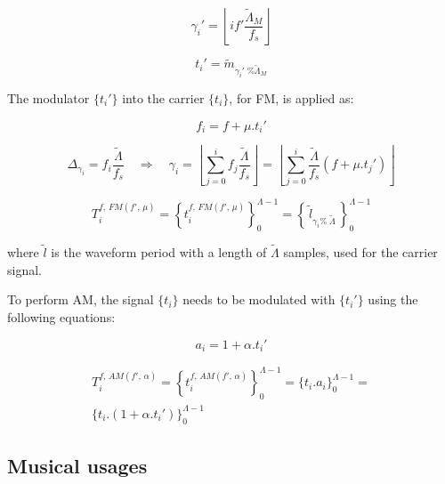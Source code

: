 \begin{equation}\label{fmGammaAux}
\gamma_i'=\left \lfloor i f' \frac{\widetilde{\Lambda}_M}{f_s} \right \rfloor
\end{equation}

\begin{equation}\label{fmAux}
t_i'=\widetilde{m}_{\gamma_i' \;\% \widetilde{\Lambda}_M}
\end{equation}

The modulator $\{t_i'\}$ into the carrier $\{t_i\}$, for FM, is applied as:

\begin{equation}\label{fmF}
f_i=f + \mu . t_i'
\end{equation}

\begin{equation}\label{fmGamma}
\Delta_{\gamma_i}=f_i\frac{\widetilde{\Lambda}}{f_s} \quad \Rightarrow \quad \gamma_i = \left \lfloor \sum_{j=0}^{i} f_j \frac{\widetilde{\Lambda}}{f_s} \right \rfloor = \left \lfloor \sum_{j=0}^{i} \frac{\widetilde{\Lambda}}{f_s}(f+\mu . t_j') \right\rfloor
\end{equation}

\begin{equation}\label{fmT}
T_i^{f,\, FM(f',\,\mu)}=\left\{ t_i^{f,\,FM(f',\,\mu)} \right\}_0^{\Lambda-1}=\left\{\,\widetilde{l}_{\gamma_i \%\; \widetilde{\Lambda} } \,\right\}_0^{\Lambda-1}
\end{equation}


\noindent where $\widetilde{l}$ is the waveform period with a length of $\widetilde{\Lambda}$ samples, used for the carrier signal.

To perform AM, the signal $\{t_i\}$ needs to be modulated with $\{t_i'\}$ using the following equations:

\begin{equation}\label{amA}
a_i=1 + \alpha . t_i'
\end{equation}

\begin{multline}\label{amT}
T_i^{f,\,AM(f',\,\alpha)}=\left\{ t_i^{f,\,AM(f',\,\alpha)} \right\}_0^{\Lambda-1}=\{ t_i . a_i \}_0^{\Lambda-1}= \\ \{t_i . (1 + \alpha . t_i')    \}_0^{\Lambda-1}
\end{multline}


\subsection{Musical usages}\label{subsec:mus2}

